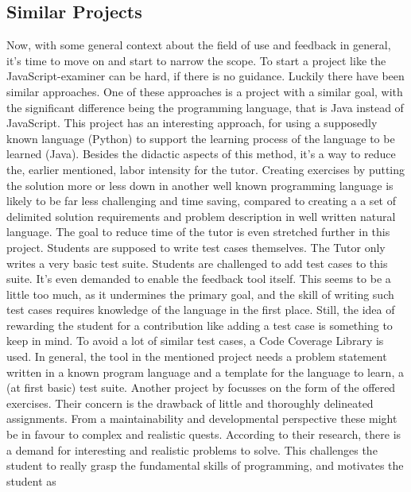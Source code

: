 \documentclass{article}
\begin{document}
\subsection{Similar Projects}
Now, with some general context about the field of use and feedback in general,
it's time to move on and
start to narrow the scope. To start a project like the JavaScript-examiner can
be hard, if there is no guidance. Luckily there have been similar approaches. 
One of these approaches is a project with a similar goal, with the significant
difference being the programming language, that is Java instead of JavaScript. 
This project  \citep{o2014java} has an interesting approach, for using a 
supposedly known language (Python) to support the learning process of the 
language to be learned (Java). %
Besides the didactic aspects of this method, it's a way to reduce the,
earlier mentioned, labor intensity for the tutor. Creating exercises by 
putting the solution more or less down in another well known programming 
language is likely
to be far less challenging and time saving, compared to creating a
a set of delimited solution requirements and problem description
in well written natural language. The goal to reduce time of the tutor is even
stretched further in this project. Students are supposed to write test cases 
themselves. The Tutor only writes a very basic test suite. Students are 
challenged to 
add test cases to this suite. It's even demanded to enable the feedback
tool itself. This seems to be a little too much, as it undermines the primary
goal, and the skill of writing such test cases requires knowledge of the
language in the first place. Still, the idea of rewarding the student for a
contribution like adding a test case is something to keep in mind. To avoid a 
lot of similar test cases, a Code Coverage Library is used. In general, 
the tool in the mentioned project needs a problem statement written in a known
program language and a template for the language to learn, a (at first basic) 
test suite. \newline
Another project by 
\citep{watson2011learning}
focusses on the form of the offered exercises. Their concern is the 
drawback of little and  thoroughly delineated assignments. From a
maintainability and developmental perspective these might be in favour 
to complex and realistic quests. According to their research, there is a demand
for interesting and realistic problems to solve. This challenges the student to
really grasp the fundamental skills of programming, and motivates the student as
\end{document}
